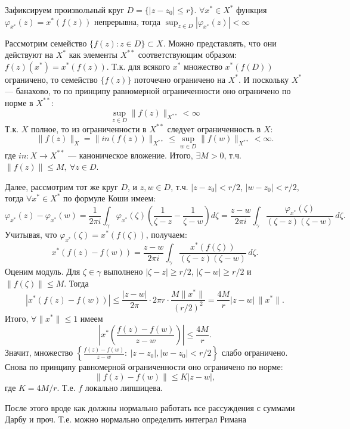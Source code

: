 \documentclass[a4paper,12pt]{article}
\begin{document}
Зафиксируем произвольный круг $D=\{|z-z_0|\le r\}$. $ \forall x^*\in X^*$ функция $\varphi_{x^*}(z)=x^*(f(z))$ непрерывна, тогда
$\sup_{z\in D}|\varphi_{x^*}(z)|<\infty$


Рассмотрим семейство $\{f(z):z\in D\}\subset X$. Можно представлять, что они действуют на $X^*$ как элементы $X^{**}$ соответствующим образом:
$f(z)(x^*)=x^*(f(z))$. Т.к. для всякого $x^*$ множество $x^*(f(D))$ ограничено, то семейство $\{f(z)\}$ поточечно ограничено на $X^*$. 
И поскольку $X^*$ --- банахово, то по принципу равномерной ограниченности оно ограничено по норме в $X^{**}$:
\[
\sup_{z\in D}\|f(z)\|_{X^{**}}<\infty
\]
Т.к. $X$ полное, то из ограниченности в $X^{**}$ следует ограниченность в $X$:
\[
\|f(z)\|_X=\|in(f(z))\|_{X^{**}}\le \sup_{w\in D}\|f(w)\|_{X^{**}}<\infty.
\]
где $in: X \to X^{**}$ --- каноническое вложение. Итого, $\exists M>0$, т.ч. $\|f(z)\|\le M, \> \forall z\in D$.

Далее, рассмотрим тот же круг $D$, и $z,w \in D$, т.ч. $|z-z_0|<r/2$, $|w-z_0|<r/2$, тогда $\forall x^*\in X^*$ по формуле Коши имеем:
\[
\varphi_{x^*}(z)-\varphi_{x^*}(w)=\frac{1}{2\pi i}\int_\gamma \varphi_{x^*}(\zeta)\left(\frac{1}{\zeta-z}-\frac{1}{\zeta-w}\right)d\zeta
= \frac{z-w}{2\pi i}\int_\gamma \frac{\varphi_{x^*}(\zeta)}{(\zeta-z)(\zeta-w)}\,d\zeta.
\]
Учитывая, что $\varphi_{x^*}(\zeta)=x^*(f(\zeta))$, получаем:
\[
x^*(f(z)-f(w))=\frac{z-w}{2\pi i}\int_\gamma \frac{x^*(f(\zeta))}{(\zeta-z)(\zeta-w)}\,d\zeta.
\]
Оценим модуль. Для $\zeta\in\gamma$ выполнено $|\zeta-z|\ge r/2$, $|\zeta-w|\ge r/2$ и $\|f(\zeta)\|\le M$. Тогда
\[
|x^*(f(z)-f(w))|\le \frac{|z-w|}{2\pi}\cdot 2\pi r\cdot \frac{M\|x^*\|}{(r/2)^2}= \frac{4M}{r}|z-w|\,\|x^*\|.
\]
Итого, $\forall \|x^*\|\le 1$ имеем
\[
\left| x^*\left(\frac{f(z)-f(w)}{z-w}\right) \right|\le \frac{4M}{r}.
\]
Значит, множество $\left\{\frac{f(z)-f(w)}{z-w}:\ |z-z_0|,|w-z_0|<r/2\right\}$ слабо ограничено. Снова по принципу равномерной ограниченности 
оно ограничено по норме:
\[
\|f(z)-f(w)\|\le K|z-w|,
\]
где $K=4M/r$. Т.е. $f$ локально липшицева.

После этого вроде как должны нормально работать все рассуждения с суммами Дарбу и проч. Т.е. можно нормально определить интеграл Римана
\end{document}
